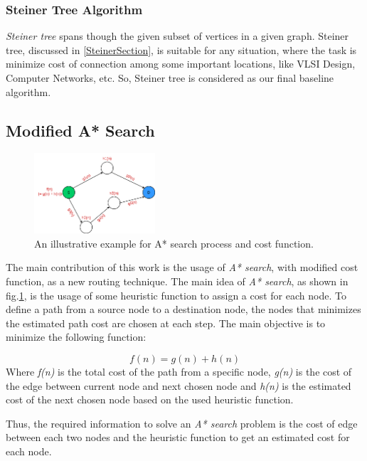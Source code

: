 \subsubsection{Steiner Tree Algorithm}
\emph{Steiner tree} spans though the given subset of vertices in a given graph. Steiner tree, discussed in \ref{SteinerSection}, is suitable for any situation, where the task is minimize cost of connection among some important locations, like VLSI Design, Computer Networks, etc. So, Steiner tree is considered as our final baseline algorithm.

\subsection{Modified A* Search}
\begin{figure}
    \centering
    \includegraphics[width=0.4\textwidth]{figures/a_star.png}
    \caption{An illustrative example for A* search process and cost function.}
    \label{fig:astar}
\end{figure}

The main contribution of this work is the usage of \emph{A* search}, with modified cost function, as a new routing technique. The main idea of \emph{A* search}, as shown in fig.\ref{fig:astar}, is the usage of some heuristic function to assign a cost for each node. To define a path from a source node to a destination node, the nodes that minimizes the estimated path cost are chosen at each step. The main objective is to minimize the following function:

\begin{equation} \label{eq:astar}
f(n) = g(n) + h(n)
\end{equation}
Where \emph{f(n)} is the total cost of the path from a specific node, \emph{g(n)} is the cost of the edge between current node and next chosen node and \emph{h(n)} is the estimated cost of the next chosen node based on the used heuristic function.

Thus, the required information to solve an \emph{A* search} problem is the cost of edge between each two nodes and the heuristic function to get an estimated cost for each node.

